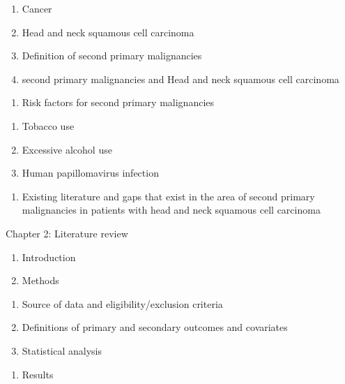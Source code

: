 \documentclass[12pt]{book}
\numberwithin{equation}{chapter}
\providecommand{\tightlist}{%
  \setlength{\itemsep}{0pt}\setlength{\parskip}{0pt}}
\begin{document}
\begin{enumerate}
\def\labelenumi{\arabic{enumi}.}
\tightlist
\item
  Cancer
\item
  Head and neck squamous cell carcinoma
\item
  Definition of second primary malignancies
\item
  second primary malignancies and Head and neck squamous cell carcinoma
\end{enumerate}

\begin{enumerate}
\def\labelenumi{\Alph{enumi}.}
\setcounter{enumi}{1}
\tightlist
\item
  Risk factors for second primary malignancies
\end{enumerate}

\begin{enumerate}
\def\labelenumi{\arabic{enumi}.}
\tightlist
\item
  Tobacco use
\item
  Excessive alcohol use
\item
  Human papillomavirus infection
\end{enumerate}

\begin{enumerate}
\def\labelenumi{\Alph{enumi}.}
\setcounter{enumi}{2}
\tightlist
\item
  Existing literature and gaps that exist in the area of second primary malignancies in patients with head and neck squamous cell carcinoma
\end{enumerate}

Chapter 2: Literature review

\begin{enumerate}
\def\labelenumi{\Alph{enumi}.}
\item
  Introduction
\item
  Methods
\end{enumerate}

\begin{enumerate}
\def\labelenumi{\arabic{enumi}.}
\tightlist
\item
  Source of data and eligibility/exclusion criteria
\item
  Definitions of primary and secondary outcomes and covariates
\item
  Statistical analysis
\end{enumerate}

\begin{enumerate}
\def\labelenumi{\Alph{enumi}.}
\setcounter{enumi}{2}
\tightlist
\item
  Results
\end{enumerate}
\end{document}
